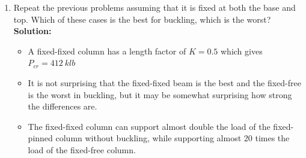 \documentclass[12pt, oneside]{article}
\let\US\SI
\begin{document}
\begin{enumerate}
	\item
		Repeat the previous problems assuming that it is fixed at both the base and top.
		Which of these cases is the best for buckling, which is the worst?
			\textbf{Solution:}
			\begin{itemize}
				\item A fixed-fixed column has a length factor of $K = 0.5$ which gives $P_{cr} = 	\US{412}{klb} $
				\item It is not surprising that the fixed-fixed beam is the best and the fixed-free is the worst in buckling, but it may be somewhat surprising how strong the differences are.
				\item The fixed-fixed column can support almost double the load of the fixed-pinned column without buckling, while supporting almost 20 times the load of the fixed-free column.
			\end{itemize}

\end{enumerate}
\end{document}
